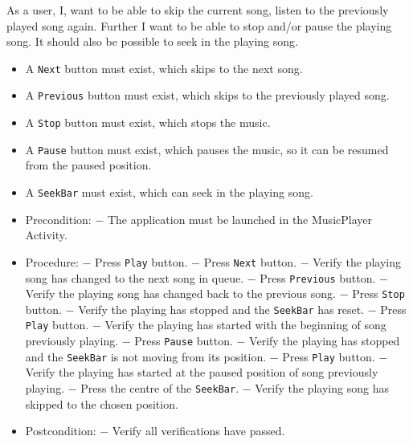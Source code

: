 {As a user, I, want to be able to skip the current song, listen to the previously played song again. 
Further I want to be able to stop and/or pause the playing song.
It should also be possible to seek in the playing song.}
{\begin{itemize}
\item A \texttt{Next} button must exist, which skips to the next song.
\item A \texttt{Previous} button must exist, which skips to the previously played song.
\item A \texttt{Stop} button must exist, which stops the music.
\item A \texttt{Pause} button must exist, which pauses the music, so it can be resumed from the paused position.
\item A \texttt{SeekBar} must exist, which can seek in the playing song.
\end{itemize}}
{\begin{itemize}
\item Precondition: 
\subitem $-$ The application must be launched in the MusicPlayer Activity.

\item Procedure:
\subitem $-$ Press \texttt{Play} button.
\subitem $-$ Press \texttt{Next} button.
\subitem $-$ Verify the playing song has changed to the next song in queue.
\subitem $-$ Press \texttt{Previous} button.
\subitem $-$ Verify the playing song has changed back to the previous song.
\subitem $-$ Press \texttt{Stop} button.
\subitem $-$ Verify the playing has stopped and the \texttt{SeekBar} has reset.
\subitem $-$ Press \texttt{Play} button.
\subitem $-$ Verify the playing has started with the beginning of song previously playing.
\subitem $-$ Press \texttt{Pause} button.
\subitem $-$ Verify the playing has stopped and the \texttt{SeekBar} is not moving from its position.
\subitem $-$ Press \texttt{Play} button.
\subitem $-$ Verify the playing has started at the paused position of song previously playing.
\subitem $-$ Press the centre of the \texttt{SeekBar}.
\subitem $-$ Verify the playing song has skipped to the chosen position.

\item Postcondition:
\subitem $-$ Verify all verifications have passed.
\end{itemize}}

